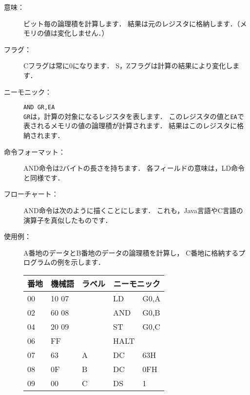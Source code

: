 \begin{description}
\item[意味：]ビット毎の論理積を計算します．
結果は元のレジスタに格納します．（メモリの値は変化しません．）

\item[フラグ：]Cフラグは常に0になります．
S，Zフラグは計算の結果により変化します．

\item[ニーモニック：]{\tt AND  GR,EA} \\
{\tt GR}は，計算の対象になるレジスタを表します．
このレジスタの値と{\tt EA}で表されるメモリの値の論理積が計算されます．
結果はこのレジスタに格納されます．

\item[命令フォーマット：]AND命令は2バイトの長さを持ちます．
各フィールドの意味は，LD命令と同様です．


\item[フローチャート：]AND命令は次のように描くことにします．
これも，Java言語やC言語の演算子を真似したものです．

\begin{center}
\end{center}

\item[使用例：]
A番地のデータとB番地のデータの論理積を計算し，
C番地に格納するプログラムの例を示します．

{\tt\small\begin{center}
\begin{tabular}{|l|l|l|l l|} \hline
番地 & 機械語 & ラベル & \multicolumn{2}{|c|}{ニーモニック} \\
\hline
00 & 10 07 &   & LD   & G0,A \\
02 & 60 08 &   & AND  & G0,B \\
04 & 20 09 &   & ST   & G0,C \\
06 & FF    &   & HALT &      \\
07 & 63    & A & DC   & 63H  \\
08 & 0F    & B & DC   & 0FH  \\
09 & 00    & C & DS   & 1    \\
\hline
\end{tabular}
\end{center}}


\begin{center}
\end{center}

\end{description}

